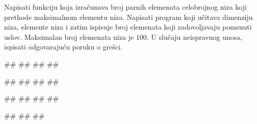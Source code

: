 \begin{Exercise}[label=p.broj_manjih_od_maksimuma] 
 Napisati funkciju koja izračunava broj parnih elemenata celobrojnog niza
 koji prethode maksimalnom elementu niza.
 Napisati program koji učitava dimenziju niza, elemente niza i zatim ispisuje broj
 elemenata koji zadovoljavaju pomenuti uslov.
 Maksimalan broj elemenata niza je $100$.
U slučaju neispravnog unosa, ispisati odgovarajuću poruku o grešci. 

\begin{miditest}
\begin{upotreba}{1}
#\naslovInt#
##
##
##
\end{upotreba}
\end{miditest}
\begin{miditest}
\begin{upotreba}{2}
#\naslovInt#
##
##
##
\end{upotreba}
\end{miditest}

\begin{miditest}
\begin{upotreba}{3}
#\naslovInt#
##
##
##
\end{upotreba}
\end{miditest}
\begin{miditest}
\begin{upotreba}{4}
#\naslovInt#
##
##
\end{upotreba}
\end{miditest}

\end{Exercise}

\ifresenja
\begin{Answer}[ref=p.broj_manjih_od_maksimuma]
\end{Answer}
\fi


